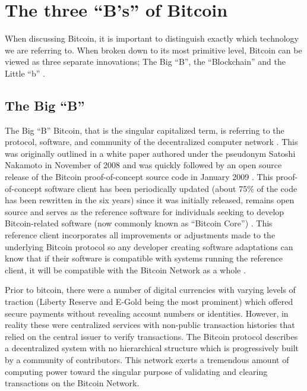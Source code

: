 \documentclass{article}
\begin{document}
    \section{The three ``B's'' of Bitcoin }
    When discussing Bitcoin, it is important to distinguish exactly which technology we are referring to. When broken down to its most primitive level, Bitcoin can be viewed as three separate innovations; The Big ``B'', the ``Blockchain'' and the Little ``b'' \citep{9_kaye_scholer_2016}\citep{10_itbit_2015}.
    
    \subsection{The Big ``B''}
   
The Big ``B'' Bitcoin, that is the singular capitalized term, is referring to the protocol, software, and community of the decentralized computer network \citep{11_help_introduction_bitcoin_wiki_2016}. This was originally outlined in a white paper \citep{12_nakamoto_2008} authored under the pseudonym Satoshi Nakamoto in November of 2008 and was quickly followed by an open source release of the Bitcoin proof-of-concept source code in January 2009 \citep{13_nakamoto_2009}. This proof-of-concept software client has been periodically updated (about 75\% of the code has been rewritten in the six years) since it was initially released, remains open source and serves as the reference software for individuals seeking to develop Bitcoin-related software (now commonly known as ``Bitcoin Core'') \citep{14_bitcoin_2009}. This reference client incorporates all improvements or adjustments made to the underlying Bitcoin protocol so any developer creating software adaptations can know that if their software is compatible with systems running the reference client, it will be compatible with the Bitcoin Network as a whole \citep{9_kaye_scholer_2016}.

Prior to bitcoin, there were a number of digital currencies with varying levels of traction (Liberty Reserve \citep{15_liberty_reserve_2014} and E-Gold \citep{16_jackson_2007} being the most prominent) which offered secure payments without revealing account numbers or identities. However, in reality these were centralized services with non-public transaction histories that relied on the central issuer to verify transactions. The Bitcoin protocol describes a decentralized system with no hierarchical structure which is progressively built \citep{17_thorpe_2016} by a community of contributors. This network exerts a tremendous amount of computing power toward the singular purpose of validating and clearing transactions on the Bitcoin Network.
\end{document}
